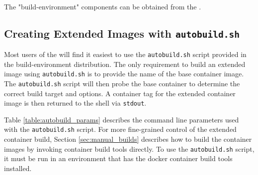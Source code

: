 \noindent\\The "build-environment" components can be obtained from the .

\subsection{Creating Extended Images with \texttt{autobuild.sh}}

Most users of the \cxtoolkit will find it easiest to use the
\texttt{autobuild.sh} script provided in the build-environment
distribution.  The only requirement to build an extended image using
\texttt{autobuild.sh} is to provide the name of the base container image.
The \texttt{autobuild.sh} script will then probe the base container to
determine the correct build target and options.  A container tag
for the extended container image is then returned to the shell
via \texttt{stdout}.

Table \ref{table:autobuild_params} describes the command line parameters used
with the \texttt{autobuild.sh} script.  For more fine-grained control of the
extended container build, Section \ref{sec:manual_builds} describes how to build
the container images by invoking container build tools directly.  To use the
\texttt{autobuild.sh} script, it must be run in an environment that has the docker
container build tools installed.


